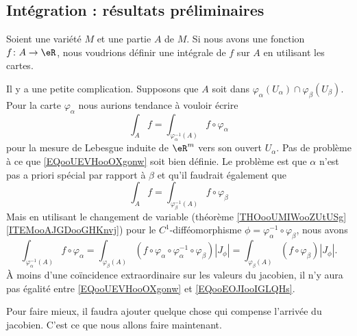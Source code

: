 \subsection{Intégration : résultats préliminaires}

Soient une variété \( M\) et une partie \( A\) de \( M\). Si nous avons une fonction \( f\colon A\to \eR\), nous voudrions définir une intégrale de \( f\) sur \( A\) en utilisant les cartes.

Il y a une petite complication. Supposons que \( A\) soit dans \( \varphi_{\alpha}(U_{\alpha})\cap \varphi_{\beta}(U_{\beta})\). Pour la carte \( \varphi_{\alpha}\) nous aurions tendance à vouloir écrire
\begin{equation}        \label{EQooUEVHooOXgonw}
    \int_A f=\int_{\varphi_{\alpha}^{-1}(A)}f\circ \varphi_{\alpha}
\end{equation}
pour la mesure de Lebesgue induite de \( \eR^m\) vers son ouvert \( U_{\alpha}\). Pas de problème à ce que \eqref{EQooUEVHooOXgonw} soit bien définie. Le problème est que \( \alpha\) n'est pas a priori spécial par rapport à \( \beta\) et qu'il faudrait également que
\begin{equation}        \label{EQooEOJIooIGLQHs}
    \int_A f=\int_{\varphi_{\beta}^{-1}(A)}f\circ \varphi_{\beta}
\end{equation}
Mais en utilisant le changement de variable (théorème \ref{THOooUMIWooZUtUSg}\ref{ITEMooAJGDooGHKnvj}) pour le \( C^1\)-difféomorphisme \( \phi=\varphi_{\alpha}^{-1}\circ \varphi_{\beta}\), nous avons
\begin{equation}
    \int_{\varphi_{\alpha}^{-1}(A)}f\circ \varphi_{\alpha}=\int_{\varphi_{\beta}(A)}(f\circ \varphi_{\alpha}\circ\varphi_{\alpha}^{-1}\circ\varphi_{\beta})| J_{\phi} |=\int_{\varphi_{\beta}(A)}(f\circ \varphi_{\beta})| J_{\phi} |.
\end{equation}
À moins d'une coïncidence extraordinaire sur les valeurs du jacobien, il n'y aura pas égalité entre \eqref{EQooUEVHooOXgonw} et \eqref{EQooEOJIooIGLQHs}.

Pour faire mieux, il faudra ajouter quelque chose qui compense l'arrivée du jacobien. C'est ce que nous allons faire maintenant.

